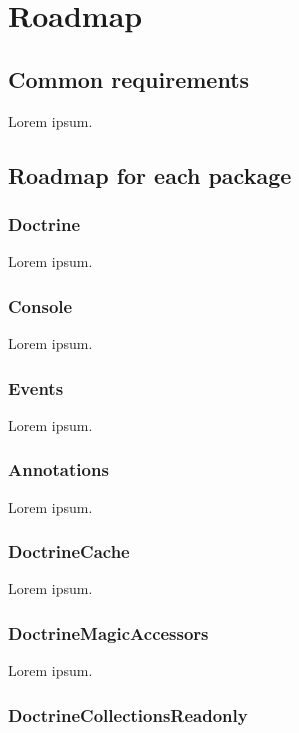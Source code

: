 \chapter{Roadmap}

\section{Common requirements}

Lorem ipsum.

\section{Roadmap for each package}

\subsection{Doctrine}

Lorem ipsum.

\subsection{Console}

Lorem ipsum.

\subsection{Events}

Lorem ipsum.

\subsection{Annotations}

Lorem ipsum.

\subsection{DoctrineCache}

Lorem ipsum.

\subsection{DoctrineMagicAccessors}

Lorem ipsum.

\subsection{DoctrineCollectionsReadonly}

